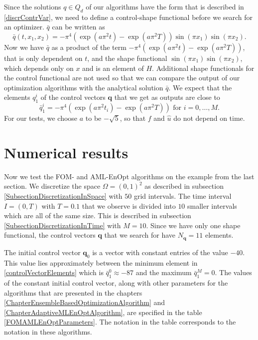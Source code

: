 Since the solutions $q\in Q_d$ of our algorithms have the form that is described in \eqref{discrContrVar}, we need to define a control-shape functional before we search for an optimizer. $\bar{q}$ can be written as
\begin{displaymath}
\bar{q}(t,x_1,x_2)=-\pi^4(\exp(a\pi^2t)-\exp(a\pi^2T))\sin(\pi x_1)\sin(\pi x_2).
\end{displaymath}
Now we have $\bar{q}$ as a product of the term $-\pi^4(\exp(a\pi^2t)-\exp(a\pi^2T))$, that is only dependent on $t$, and the shape functional $\sin(\pi x_1)\sin(\pi x_2)$, which depends only on $x$ and is an element of $H$. Additional shape functionals for the control functional are not used so that we can compare the output of our optimization algorithms with the analytical solution $\bar{q}$. We expect that the elements $q^i_1$ of the control vectors $\mathbf{q}$ that we get as outputs are close to
\begin{equation}
\label{controlVectorElements}
\bar{q}^i_1=-\pi^4(\exp(a\pi^2t_i)-\exp(a\pi^2T))\text{ for }i=0,\dotsc,M.
\end{equation}
For our tests, we choose $a$ to be $-\sqrt{5}$, so that $f$ and $\hat{u}$ do not depend on time.

\section{Numerical results}

Now we test the FOM- and AML-EnOpt algorithms on the example from the last section. We discretize the space $\Omega=(0,1)^2$ as described in subsection \ref{SubsectionDiscretizationInSpace} with $50$ grid intervals. The time interval $I=(0,T)$ with $T=0.1$ that we observe is divided into $10$ smaller intervals which are all of the same size. This is described in subsection \ref{SubsectionDiscretizationInTime} with $M=10$. Since we have only one shape functional, the control vectors $\mathbf{q}$ that we search for have $N_\mathbf{q}=11$ elements.

The initial control vector $\mathbf{q}_0$ is a vector with constant entries of the value $-40$. This value lies approximately between the minimum element in \eqref{controlVectorElements} which is $\bar{q}^0_1\approx-87$ and the maximum $\bar{q}^M_1=0$. The values of the constant initial control vector, along with other parameters for the algorithms that are presented in the chapters \ref{ChapterEnsembleBasedOptimizationAlgorithm} and \ref{ChapterAdaptiveMLEnOptAlgorithm}, are specified in the table \ref{FOMAMLEnOptParameters}. The notation in the table corresponds to the notation in these algorithms.

